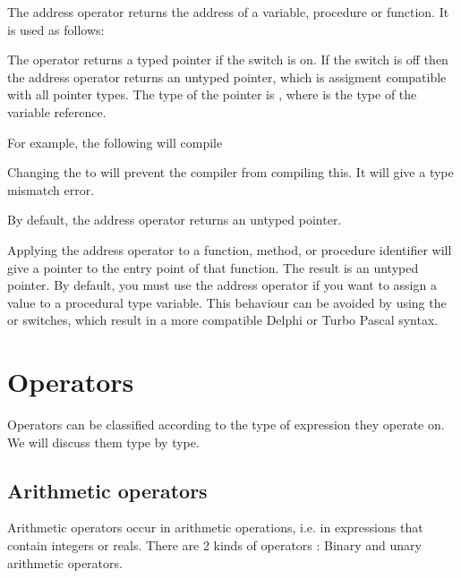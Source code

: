 \documentclass{report}
\begin{document}
The address operator  returns the address of a variable, procedure 
or function. It is used as follows:



The  operator returns a typed pointer if the  switch is on. 
If the  switch is off then the address operator returns an untyped
pointer, which is assigment compatible with all pointer types. The type of
the pointer is , where  is the type of the variable
reference.

For example, the following will compile
Changing the  to  will prevent the compiler from
compiling this. It will give a type mismatch error.

By default, the address operator returns an untyped pointer.

Applying the address operator to a function, method, or procedure identifier
will give a pointer to the entry point of that function. The result is an
untyped pointer. 
By default, you must use the address operator if you want to assign a value 
to a procedural type variable. This behaviour can be avoided by using the
 or  switches, which result in a more compatible Delphi or
Turbo Pascal syntax.

\section{Operators}

Operators can be classified according to the type of expression they
operate on. We will discuss them type by type.

\subsection{Arithmetic operators}

Arithmetic operators occur in arithmetic operations, i.e. in expressions
that contain integers or reals. There are 2 kinds of operators : Binary and
unary arithmetic operators. 
\end{document}
